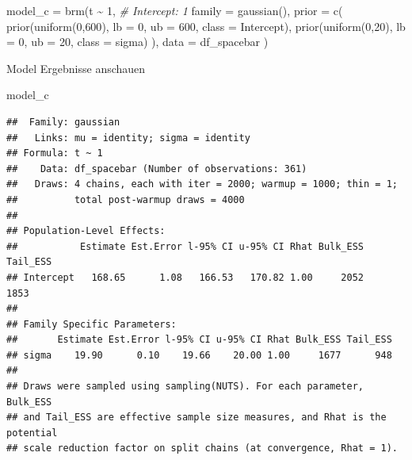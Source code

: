 \documentclass[
]{article}
\newenvironment{Shaded}{\begin{snugshade}}{\end{snugshade}}
\newcommand{\AttributeTok}[1]{\textcolor[rgb]{0.77,0.63,0.00}{#1}}
\newcommand{\CommentTok}[1]{\textcolor[rgb]{0.56,0.35,0.01}{\textit{#1}}}
\newcommand{\DecValTok}[1]{\textcolor[rgb]{0.00,0.00,0.81}{#1}}
\newcommand{\FunctionTok}[1]{\textcolor[rgb]{0.00,0.00,0.00}{#1}}
\newcommand{\NormalTok}[1]{#1}
\newcommand{\OtherTok}[1]{\textcolor[rgb]{0.56,0.35,0.01}{#1}}
\newcommand{\SpecialCharTok}[1]{\textcolor[rgb]{0.00,0.00,0.00}{#1}}
\begin{document}
\begin{Shaded}
\begin{Highlighting}[]
\NormalTok{model\_c }\OtherTok{=} \FunctionTok{brm}\NormalTok{(t }\SpecialCharTok{\textasciitilde{}} \DecValTok{1}\NormalTok{,    }\CommentTok{\# Intercept: 1}
              \AttributeTok{family =} \FunctionTok{gaussian}\NormalTok{(),}
              \AttributeTok{prior =}
                  \FunctionTok{c}\NormalTok{(}
                    \FunctionTok{prior}\NormalTok{(}\FunctionTok{uniform}\NormalTok{(}\DecValTok{0}\NormalTok{,}\DecValTok{600}\NormalTok{), }\AttributeTok{lb =} \DecValTok{0}\NormalTok{, }\AttributeTok{ub =} \DecValTok{600}\NormalTok{, }\AttributeTok{class =}\NormalTok{ Intercept),}
                    \FunctionTok{prior}\NormalTok{(}\FunctionTok{uniform}\NormalTok{(}\DecValTok{0}\NormalTok{,}\DecValTok{20}\NormalTok{), }\AttributeTok{lb =} \DecValTok{0}\NormalTok{, }\AttributeTok{ub =} \DecValTok{20}\NormalTok{, }\AttributeTok{class =}\NormalTok{ sigma)}
\NormalTok{                  ),}
                \AttributeTok{data =}\NormalTok{ df\_spacebar}
\NormalTok{              )}
\end{Highlighting}
\end{Shaded}

Model Ergebnisse anschauen

\begin{Shaded}
\begin{Highlighting}[]
\NormalTok{model\_c}
\end{Highlighting}
\end{Shaded}

\begin{verbatim}
##  Family: gaussian 
##   Links: mu = identity; sigma = identity 
## Formula: t ~ 1 
##    Data: df_spacebar (Number of observations: 361) 
##   Draws: 4 chains, each with iter = 2000; warmup = 1000; thin = 1;
##          total post-warmup draws = 4000
## 
## Population-Level Effects: 
##           Estimate Est.Error l-95% CI u-95% CI Rhat Bulk_ESS Tail_ESS
## Intercept   168.65      1.08   166.53   170.82 1.00     2052     1853
## 
## Family Specific Parameters: 
##       Estimate Est.Error l-95% CI u-95% CI Rhat Bulk_ESS Tail_ESS
## sigma    19.90      0.10    19.66    20.00 1.00     1677      948
## 
## Draws were sampled using sampling(NUTS). For each parameter, Bulk_ESS
## and Tail_ESS are effective sample size measures, and Rhat is the potential
## scale reduction factor on split chains (at convergence, Rhat = 1).
\end{verbatim}
\end{document}
